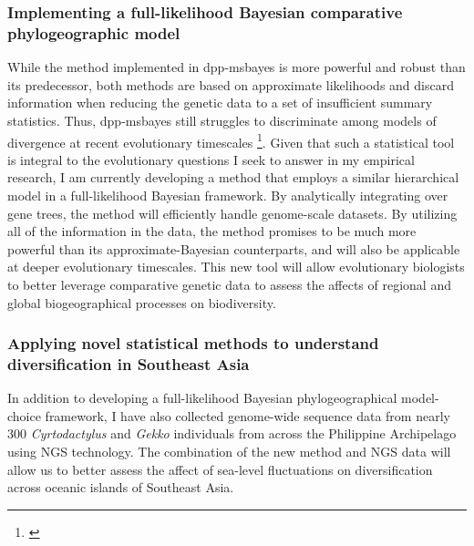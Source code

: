 \subsubsection*{Implementing a full-likelihood Bayesian comparative
    phylogeographic model}
While the method implemented in dpp-msbayes is more powerful and robust than
its predecessor, both methods are based on approximate likelihoods and discard
information when reducing the genetic data to a set of insufficient summary
statistics.
Thus, dpp-msbayes still struggles to discriminate among models of divergence at
recent evolutionary timescales \footnote{\label{Oaks14dpp}}.
Given that such a statistical tool is integral to the evolutionary questions
I seek to answer in my empirical research,
I am currently developing a method that employs a similar hierarchical model in
a full-likelihood Bayesian framework.
By analytically integrating over gene trees, the method will efficiently handle
genome-scale datasets.
By utilizing all of the information in the data, the method promises to be much
more powerful than its approximate-Bayesian counterparts, and will also be
applicable at deeper evolutionary timescales.
This new tool will allow evolutionary biologists to better leverage comparative
genetic data to assess the affects of regional and global biogeographical
processes on biodiversity.

\subsubsection*{Applying novel statistical methods to understand diversification
    in Southeast Asia}
In addition to developing a full-likelihood Bayesian phylogeographical
model-choice framework, I have also collected genome-wide sequence data from
nearly 300 \emph{Cyrtodactylus} and \emph{Gekko} individuals from across the
Philippine Archipelago using NGS technology.
The combination of the new method and NGS data will allow us to better assess
the affect of sea-level fluctuations on diversification across oceanic islands
of Southeast Asia.

